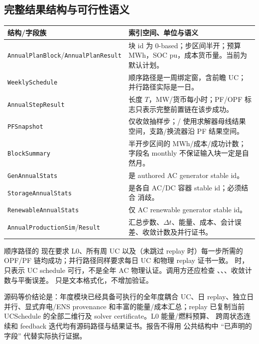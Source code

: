 \subsection{完整结果结构与可行性语义}
\begin{longtable}{@{}L{4.3cm}L{9.3cm}@{}}
\toprule
结构/字段族 & 索引空间、单位与语义\\ \midrule
\texttt{AnnualPlanBlock}/\newline\texttt{AnnualPlanResult} & 块 id 为 0-based；步区间半开；预算 MWh，SOC pu，成本货币量。当前为默认计划。\\
\texttt{WeeklySchedule} & 顺序路径是一周绑定窗，含前瞻 UC；并行路径实际是一日。\\
\texttt{AnnualStepResult} & 长度 $T$，MW/货币每小时；PF/OPF 标志只表示完整前置链在该步成功。\\
\texttt{PFSnapshot} & 仅收敛抽样步；/ 使用求解器母线结果空间，支路/换流器沿 PF 结果空间。\\
\texttt{BlockSummary} & 半开步区间的 MWh/成本/成功计数；字段名 monthly 不保证输入块一定是自然月。\\
\texttt{GenAnnualStats} &  是 authored AC generator stable id。\\
\texttt{StorageAnnualStats} &  是各自 AC/DC 容器 stable id；必须结合  消歧。\\
\texttt{RenewableAnnualStats} & 仅 AC renewable generator stable id。\\
\texttt{AnnualProductionSim}/\newline\texttt{Result} & 汇总步数、$\Delta t$、能量、成本、会计误差、收敛计数及并行证书。\\
\bottomrule
\end{longtable}

顺序路径的  现在要求 L0、所有周 UC 以及（未跳过 replay 时）每一步所需的
OPF/PF 链均成功；并行路径同样要求每日 UC 和物理 replay 证书一致。
时， 只表示 UC schedule 可行，不是全年 AC 物理认证。调用方还应检查
、、、收敛计数与平衡误差。
 只是文本格式化，不增加验证。

\begin{gapnote}
源码等价结论是：年度模块已经具备可执行的全年度耦合 UC、日 replay、独立日并行、显式弃电/ENS provenance
和丰富的能量/成本汇总；replay 已复制当前 UCSchedule 的全部二维行及 solver certificate。L0 能量/燃料预算、
跨周状态连续和 feedback 迭代均有源码路径与结果证书。报告不得用
公共结构中 ``已声明的字段'' 代替实际执行证据。
\end{gapnote}


